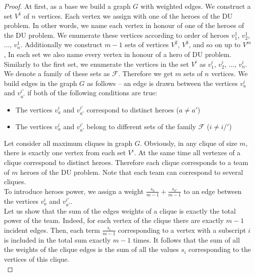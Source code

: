 \documentclass[smallextended]{svjour3}       %
\begin{document}
\begin{proof}

	At first, as a base we build a graph $G$ with weighted edges.
    We construct a set $V^1 $ of $n$ vertices. Each vertex we assign with one of the heroes of the DU problem. In other words, we name each vertex in honour of one of the heroes of the DU problem. We enumerate these vertices according to order of heroes $v_1^1$, $v_2^1$, ..., $ v_n^1$.
    Additionally we construct $m-1$ sets of vertices $ V^2 $, $ V^3 $, and so on up to $ V^m $, In each set we also name every vertex in honour of a hero of  DU problem. Similarly to the first set, we enumerate the vertices in the set $V^i $ as $ v_1^i $, $v_2^i$, ..., $v_n^i$.
    We denote a family of these sets as $ \mathcal{F} $. Therefore we get $m$ sets of $n$ vertices.
   We build edges in the graph $G$ as follows --  an edge is drawn between the vertices $v_a^i $ and $v_{a'}^{i'} $  if both of the following conditions are true:
    \begin{itemize}
        \item The vertices $v_a^i $ and $v_{a'}^{i'} $ correspond to distinct heroes ($a \neq a'$)
        \item The vertices $v_a^i $ and $v_{a'}^{i'} $ belong to different sets of the family $\mathcal{F}$ ($ i \neq i /'$)
    \end{itemize}

    Let consider all maximum cliques in graph $G$. Obviously, in any clique of size $m$, there is exactly one vertex from each set $ V^i $. At the same time all vertexes of a clique correspond to distinct heroes. Therefore each clique corresponds to a team of $m$ heroes of the DU problem. Note that each team can correspond to several cliques.\\
    To introduce heroes power, we assign a weight $ \frac{s_a}{m-1} + \frac{s_{a '}}{m-1}$ to an edge between the vertices $v_a^i$ and $v_{a'}^{i'}$.\\
    Let us show that the sum of the edges weights of a clique is exactly the total power of the team. Indeed, for each vertex of the clique there are exactly $m-1$ incident edges. Then, each term $\frac{s_i}{m-1}$ corresponding to a vertex with a subscript $i$ is included in the total sum exactly $m-1$ times. It follows that the sum of all the weights of the clique edges is the sum of all the values $s_i$ corresponding to the vertices of this clique.\\


\end{proof}
\end{document}
